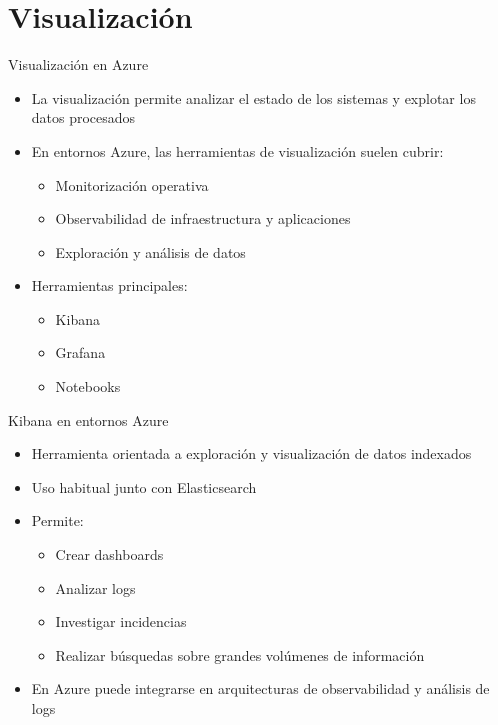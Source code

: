 \documentclass{beamer}
\begin{document}
\section{Visualización}

\begin{frame}{Visualización en Azure}
\begin{itemize}
    \item La visualización permite analizar el estado de los sistemas y explotar los datos procesados
    \item En entornos Azure, las herramientas de visualización suelen cubrir:
    \begin{itemize}
        \item Monitorización operativa
        \item Observabilidad de infraestructura y aplicaciones
        \item Exploración y análisis de datos
    \end{itemize}
    \item Herramientas principales:
    \begin{itemize}
        \item Kibana
        \item Grafana
        \item Notebooks
    \end{itemize}
\end{itemize}
\end{frame}

\begin{frame}{Kibana en entornos Azure}
\begin{itemize}
    \item Herramienta orientada a exploración y visualización de datos indexados
    \item Uso habitual junto con Elasticsearch
    \item Permite:
    \begin{itemize}
        \item Crear dashboards
        \item Analizar logs
        \item Investigar incidencias
        \item Realizar búsquedas sobre grandes volúmenes de información
    \end{itemize}
    \item En Azure puede integrarse en arquitecturas de observabilidad y análisis de logs
\end{itemize}
\end{frame}
\end{document}
